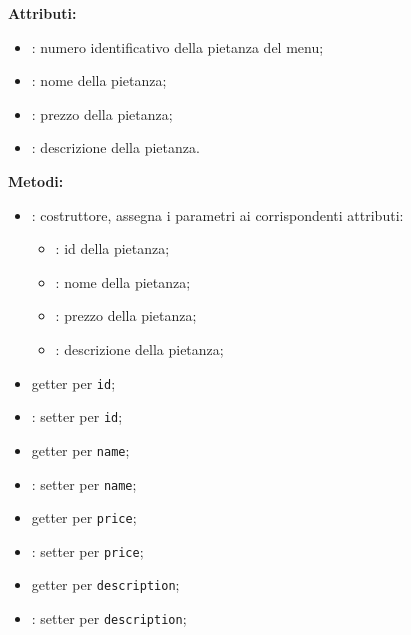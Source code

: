 %

\textbf{Attributi:}
\begin{itemize}
	\item {}: numero identificativo della pietanza del menu;
	\item {}: nome della pietanza;
	\item {}: prezzo della pietanza;
	\item {}: descrizione della pietanza.
\end{itemize}

\textbf{Metodi:}
\begin{itemize}
	\item {}: costruttore, assegna i parametri ai corrispondenti attributi:
	\begin{itemize}
		\item {}: id della pietanza;
		\item {}: nome della pietanza;
		\item {}: prezzo della pietanza;
		\item {}: descrizione della pietanza;
	\end{itemize}
	\item {} getter per \texttt{id};
	\item {}: setter per \texttt{id};
	\item {} getter per \texttt{name};
	\item {}: setter per \texttt{name};
	\item {} getter per \texttt{price};
	\item {}: setter per \texttt{price};
	\item {} getter per \texttt{description};
	\item {}: setter per \texttt{description};
\end{itemize}

